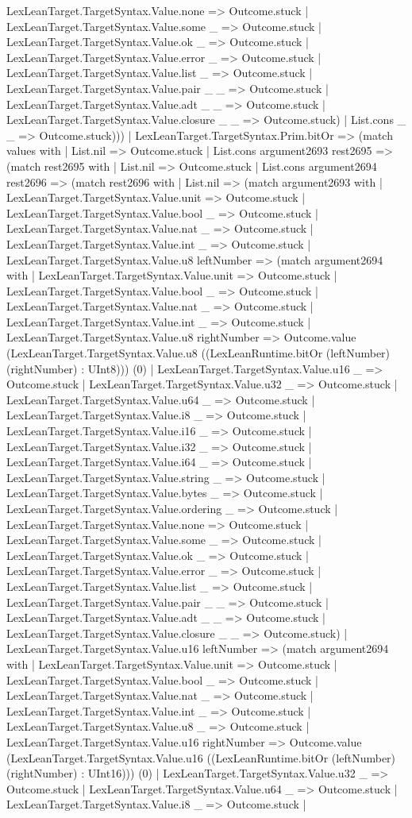 \documentclass[11pt]{article}
\begin{document}
LexLeanTarget.TargetSyntax.Value.none => Outcome.stuck | LexLeanTarget.TargetSyntax.Value.some \_ => Outcome.stuck | LexLeanTarget.TargetSyntax.Value.ok \_ => Outcome.stuck | LexLeanTarget.TargetSyntax.Value.error \_ => Outcome.stuck | LexLeanTarget.TargetSyntax.Value.list \_ => Outcome.stuck | LexLeanTarget.TargetSyntax.Value.pair \_ \_ => Outcome.stuck | LexLeanTarget.TargetSyntax.Value.adt \_ \_ => Outcome.stuck | LexLeanTarget.TargetSyntax.Value.closure \_ \_ => Outcome.stuck) | List.cons \_ \_ => Outcome.stuck))) | LexLeanTarget.TargetSyntax.Prim.bitOr => (match values with | List.nil => Outcome.stuck | List.cons argument2693 rest2695 => (match rest2695 with | List.nil => Outcome.stuck | List.cons argument2694 rest2696 => (match rest2696 with | List.nil => (match argument2693 with | LexLeanTarget.TargetSyntax.Value.unit => Outcome.stuck | LexLeanTarget.TargetSyntax.Value.bool \_ => Outcome.stuck | LexLeanTarget.TargetSyntax.Value.nat \_ => Outcome.stuck | LexLeanTarget.TargetSyntax.Value.int \_ => Outcome.stuck | LexLeanTarget.TargetSyntax.Value.u8 leftNumber => (match argument2694 with | LexLeanTarget.TargetSyntax.Value.unit => Outcome.stuck | LexLeanTarget.TargetSyntax.Value.bool \_ => Outcome.stuck | LexLeanTarget.TargetSyntax.Value.nat \_ => Outcome.stuck | LexLeanTarget.TargetSyntax.Value.int \_ => Outcome.stuck | LexLeanTarget.TargetSyntax.Value.u8 rightNumber => Outcome.value (LexLeanTarget.TargetSyntax.Value.u8 ((LexLeanRuntime.bitOr (leftNumber) (rightNumber) : UInt8))) (0) | LexLeanTarget.TargetSyntax.Value.u16 \_ => Outcome.stuck | LexLeanTarget.TargetSyntax.Value.u32 \_ => Outcome.stuck | LexLeanTarget.TargetSyntax.Value.u64 \_ => Outcome.stuck | LexLeanTarget.TargetSyntax.Value.i8 \_ => Outcome.stuck | LexLeanTarget.TargetSyntax.Value.i16 \_ => Outcome.stuck | LexLeanTarget.TargetSyntax.Value.i32 \_ => Outcome.stuck | LexLeanTarget.TargetSyntax.Value.i64 \_ => Outcome.stuck | LexLeanTarget.TargetSyntax.Value.string \_ => Outcome.stuck | LexLeanTarget.TargetSyntax.Value.bytes \_ => Outcome.stuck | LexLeanTarget.TargetSyntax.Value.ordering \_ => Outcome.stuck | LexLeanTarget.TargetSyntax.Value.none => Outcome.stuck | LexLeanTarget.TargetSyntax.Value.some \_ => Outcome.stuck | LexLeanTarget.TargetSyntax.Value.ok \_ => Outcome.stuck | LexLeanTarget.TargetSyntax.Value.error \_ => Outcome.stuck | LexLeanTarget.TargetSyntax.Value.list \_ => Outcome.stuck | LexLeanTarget.TargetSyntax.Value.pair \_ \_ => Outcome.stuck | LexLeanTarget.TargetSyntax.Value.adt \_ \_ => Outcome.stuck | LexLeanTarget.TargetSyntax.Value.closure \_ \_ => Outcome.stuck) | LexLeanTarget.TargetSyntax.Value.u16 leftNumber => (match argument2694 with | LexLeanTarget.TargetSyntax.Value.unit => Outcome.stuck | LexLeanTarget.TargetSyntax.Value.bool \_ => Outcome.stuck | LexLeanTarget.TargetSyntax.Value.nat \_ => Outcome.stuck | LexLeanTarget.TargetSyntax.Value.int \_ => Outcome.stuck | LexLeanTarget.TargetSyntax.Value.u8 \_ => Outcome.stuck | LexLeanTarget.TargetSyntax.Value.u16 rightNumber => Outcome.value (LexLeanTarget.TargetSyntax.Value.u16 ((LexLeanRuntime.bitOr (leftNumber) (rightNumber) : UInt16))) (0) | LexLeanTarget.TargetSyntax.Value.u32 \_ => Outcome.stuck | LexLeanTarget.TargetSyntax.Value.u64 \_ => Outcome.stuck | LexLeanTarget.TargetSyntax.Value.i8 \_ => Outcome.stuck | 
\end{document}

